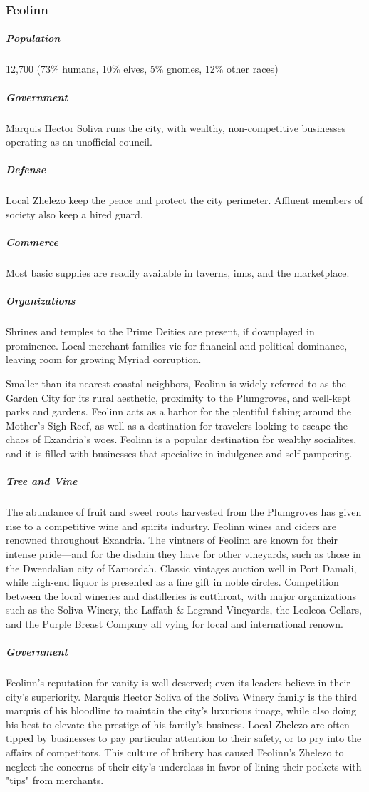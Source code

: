 \documentclass[10pt,a4paper,twoside,bg=print,twocolumn,openany,nodeprecatedcode]{dndbook}
\begin{document}
\subsubsection{Feolinn}
\subparagraph{Population}
12,700 (73\% humans, 10\% elves, 5\% gnomes, 12\% other races)

\subparagraph{Government}
Marquis Hector Soliva runs the city, with wealthy, non-competitive businesses operating as an unofficial council.

\subparagraph{Defense}
Local Zhelezo keep the peace and protect the city perimeter. Affluent members of society also keep a hired guard.

\subparagraph{Commerce}
Most basic supplies are readily available in taverns, inns, and the marketplace.

\subparagraph{Organizations}
Shrines and temples to the Prime Deities are present, if downplayed in prominence. Local merchant families vie for financial and political dominance, leaving room for growing Myriad corruption.

Smaller than its nearest coastal neighbors, Feolinn is widely referred to as the Garden City for its rural aesthetic, proximity to the Plumgroves, and well-kept parks and gardens. Feolinn acts as a harbor for the plentiful fishing around the Mother's Sigh Reef, as well as a destination for travelers looking to escape the chaos of Exandria's woes. Feolinn is a popular destination for wealthy socialites, and it is filled with businesses that specialize in indulgence and self-pampering.

\subparagraph{Tree and Vine}
The abundance of fruit and sweet roots harvested from the Plumgroves has given rise to a competitive wine and spirits industry. Feolinn wines and ciders are renowned throughout Exandria. The vintners of Feolinn are known for their intense pride—and for the disdain they have for other vineyards, such as those in the Dwendalian city of Kamordah. Classic vintages auction well in Port Damali, while high-end liquor is presented as a fine gift in noble circles. Competition between the local wineries and distilleries is cutthroat, with major organizations such as the Soliva Winery, the Laffath \& Legrand Vineyards, the Leoleoa Cellars, and the Purple Breast Company all vying for local and international renown.

\subparagraph{Government}
Feolinn's reputation for vanity is well-deserved; even its leaders believe in their city's superiority. Marquis Hector Soliva of the Soliva Winery family is the third marquis of his bloodline to maintain the city's luxurious image, while also doing his best to elevate the prestige of his family's business. Local Zhelezo are often tipped by businesses to pay particular attention to their safety, or to pry into the affairs of competitors. This culture of bribery has caused Feolinn's Zhelezo to neglect the concerns of their city's underclass in favor of lining their pockets with "tips" from merchants.
\end{document}
